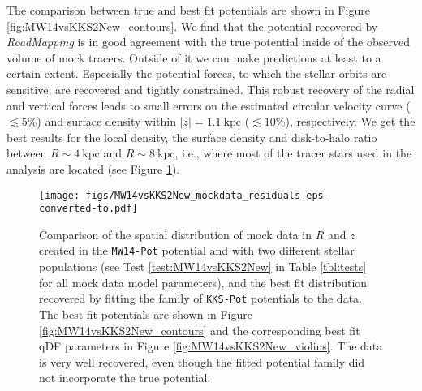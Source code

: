 \documentclass[iop,revtex4,numberedappendix,appendixfloats]{emulateapj}
\newcommand{\RM}{{\sl RoadMapping}}
\begin{document}
The comparison between true and best fit potentials are shown in Figure \ref{fig:MW14vsKKS2New_contours}. We find that the potential recovered by \RM{} is in good agreement with the true potential inside of the observed volume of mock tracers. Outside of it we can make predictions at least to a certain extent. Especially the potential forces, to which the stellar orbits are sensitive, are recovered and tightly constrained. This robust recovery of the radial and vertical forces leads to small errors on the estimated circular velocity curve ($\lesssim 5\%$) and surface density within $|z| = 1.1~\text{kpc}$ ($\lesssim 10\%$), respectively. We get the best results for the local density, the surface density and disk-to-halo ratio between $R\sim4~\text{kpc}$ and $R\sim8~\text{kpc}$, i.e., where most of the tracer stars used in the analysis are located (see Figure \ref{fig:MW14vsKKS2New_mockdata_residuals}).

\begin{figure}[!htbp]
\centering
\texttt{[image: figs/MW14vsKKS2New\_mockdata\_residuals-eps-converted-to.pdf]}
\caption{Comparison of the spatial distribution of mock data in $R$ and $z$ created in the \texttt{MW14-Pot} potential and with two different stellar populations (see Test \ref{test:MW14vsKKS2New} in Table \ref{tbl:tests} for all mock data model parameters), and the best fit distribution recovered by fitting the family of \texttt{KKS-Pot} potentials to the data. The best fit potentials are shown in Figure \ref{fig:MW14vsKKS2New_contours} and the corresponding best fit qDF parameters in Figure \ref{fig:MW14vsKKS2New_violins}. The data is very well recovered, even though the fitted potential family did not incorporate the true potential.}
\label{fig:MW14vsKKS2New_mockdata_residuals}
\end{figure}
\end{document}
